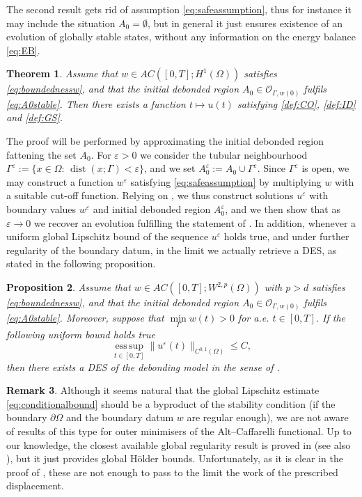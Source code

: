 \documentclass[a4paper,11pt,reqno]{amsart}
\numberwithin{equation}{section}
\newtheorem{teo}{Theorem}[section]
\newtheorem{prop}[teo]{Proposition}
\theoremstyle{definition}
\newtheorem{remark}[teo]{Remark}
\theoremstyle{remark}
\DeclareMathOperator*{\esssup}{ess\, sup}
\begin{document}
The second result gets rid of assumption \eqref{eq:safeassumption}, thus for instance it may include the situation $A_0=\emptyset$, but in general it just ensures existence of an evolution of globally stable states, without any information on the energy balance \eqref{eq:EB}.
\begin{teo}\label{thm:general}
    Assume that $w\in AC([0,T];H^1(\Omega))$ satisfies \eqref{eq:boundednessw}, and that the initial debonded region $A_0\in \mathcal O_{\Gamma,w(0)}$ fulfils \eqref{eq:A0stable}. Then there exists a function $t\mapsto u(t)$ satisfying \ref{def:CO}, \ref{def:ID} and \ref{def:GS}.   
\end{teo}
The proof will be performed by approximating the initial debonded region fattening the set $A_0$. For $\varepsilon>0$ we consider the tubular neighbourhood $\Gamma^\varepsilon:=\{x\in \Omega :\, \operatorname{dist}(x;\Gamma)<\varepsilon\}$, and we set $A_0^\varepsilon:= A_0\cup \Gamma^\varepsilon$. Since $\Gamma^\varepsilon$ is open, we may construct a function $w^\varepsilon$ satisfying \eqref{eq:safeassumption} by multiplying $w$ with a suitable cut-off function.
Relying on , we thus construct solutions $u^\varepsilon$ with boundary values $w^\varepsilon$ and initial debonded region $A^\varepsilon_0$, and we then show that as $\varepsilon\to 0$ we recover an evolution fulfilling the statement of . In addition, whenever a uniform global Lipschitz bound of the sequence $u^\varepsilon$ holds true, and under further regularity of the boundary datum, in the limit we actually retrieve a DES, as stated in the following proposition.
\begin{prop}
    \label{thm:conditional}Assume that $w\in AC([0,T];W^{2,p}(\Omega))$ with $p>d$ satisfies \eqref{eq:boundednessw}, and that the initial debonded region $A_0\in \mathcal O_{\Gamma,w(0)}$ fulfils \eqref{eq:A0stable}. Moreover, suppose that $\min\limits_\Gamma w(t)>0$ for a.e. $t\in [0,T]$. If the following uniform bound holds true
    \begin{equation}\label{eq:conditionalbound}
        \esssup\limits_{t\in [0,T]}\|u^\varepsilon(t)\|_{C^{0,1}(\Omega)}\le C,
    \end{equation}
    then there exists a DES of the debonding model in the sense of . 
\end{prop} 
\begin{remark}
    Although it seems natural that the global Lipschitz estimate \eqref{eq:conditionalbound} should be a byproduct of the stability condition (if the boundary $\partial\Omega$ and the boundary datum $w$ are regular enough), we are not aware of results of this type for outer minimisers of the Alt--Caffarelli functional. Up to our knowledge, the closest available global regularity result is proved in \cite{fernandez2024continuity} (see also \cite[Appendix B]{Ede}), but it just provides global H\"older bounds. Unfortunately, as it is clear in the proof of , these are not enough to pass to the limit the work of the prescribed displacement. 
\end{remark}
\end{document}
